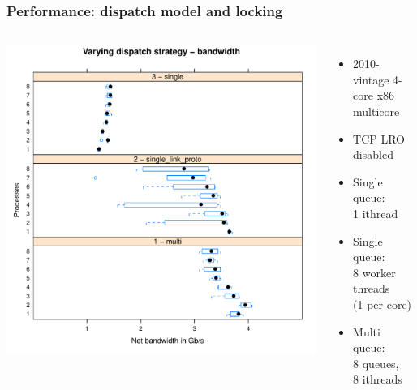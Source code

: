 \begin{frame}
  \frametitle{Performance: dispatch model and locking}

  \begin{columns}[T]
      \includegraphics[width=1.1\textwidth]{../../figures/2010-dispatch-variations.pdf}

      \begin{itemize}
	\item 2010-vintage 4-core x86 multicore
	\item TCP LRO disabled
	\item Single queue: \\ 1 ithread
	\item Single queue: \\ 8 worker threads \\ (1 per core)
	\item Multi queue: \\ 8 queues, \\ 8 ithreads
      \end{itemize}
  \end{columns}
\end{frame}

